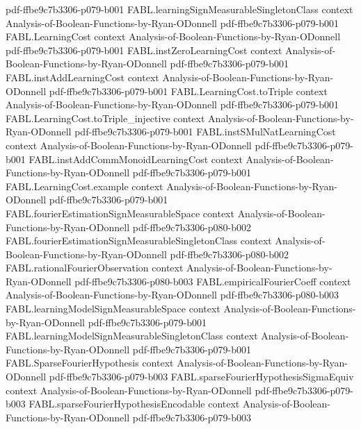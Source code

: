 \begin{theorem}
  {pdf-ffbe9c7b3306-p079-b001}
\proofstep
  {FABL.learningSignMeasurableSingletonClass}
  {context}
  {Analysis-of-Boolean-Functions-by-Ryan-ODonnell}
  {pdf-ffbe9c7b3306-p079-b001}
\proofstep
  {FABL.LearningCost}
  {context}
  {Analysis-of-Boolean-Functions-by-Ryan-ODonnell}
  {pdf-ffbe9c7b3306-p079-b001}
\proofstep
  {FABL.instZeroLearningCost}
  {context}
  {Analysis-of-Boolean-Functions-by-Ryan-ODonnell}
  {pdf-ffbe9c7b3306-p079-b001}
\proofstep
  {FABL.instAddLearningCost}
  {context}
  {Analysis-of-Boolean-Functions-by-Ryan-ODonnell}
  {pdf-ffbe9c7b3306-p079-b001}
\proofstep
  {FABL.LearningCost.toTriple}
  {context}
  {Analysis-of-Boolean-Functions-by-Ryan-ODonnell}
  {pdf-ffbe9c7b3306-p079-b001}
\proofstep
  {FABL.LearningCost.toTriple_injective}
  {context}
  {Analysis-of-Boolean-Functions-by-Ryan-ODonnell}
  {pdf-ffbe9c7b3306-p079-b001}
\proofstep
  {FABL.instSMulNatLearningCost}
  {context}
  {Analysis-of-Boolean-Functions-by-Ryan-ODonnell}
  {pdf-ffbe9c7b3306-p079-b001}
\proofstep
  {FABL.instAddCommMonoidLearningCost}
  {context}
  {Analysis-of-Boolean-Functions-by-Ryan-ODonnell}
  {pdf-ffbe9c7b3306-p079-b001}
\proofstep
  {FABL.LearningCost.example}
  {context}
  {Analysis-of-Boolean-Functions-by-Ryan-ODonnell}
  {pdf-ffbe9c7b3306-p079-b001}
\proofstep
  {FABL.fourierEstimationSignMeasurableSpace}
  {context}
  {Analysis-of-Boolean-Functions-by-Ryan-ODonnell}
  {pdf-ffbe9c7b3306-p080-b002}
\proofstep
  {FABL.fourierEstimationSignMeasurableSingletonClass}
  {context}
  {Analysis-of-Boolean-Functions-by-Ryan-ODonnell}
  {pdf-ffbe9c7b3306-p080-b002}
\proofstep
  {FABL.rationalFourierObservation}
  {context}
  {Analysis-of-Boolean-Functions-by-Ryan-ODonnell}
  {pdf-ffbe9c7b3306-p080-b003}
\proofstep
  {FABL.empiricalFourierCoeff}
  {context}
  {Analysis-of-Boolean-Functions-by-Ryan-ODonnell}
  {pdf-ffbe9c7b3306-p080-b003}
\proofstep
  {FABL.learningModelSignMeasurableSpace}
  {context}
  {Analysis-of-Boolean-Functions-by-Ryan-ODonnell}
  {pdf-ffbe9c7b3306-p079-b001}
\proofstep
  {FABL.learningModelSignMeasurableSingletonClass}
  {context}
  {Analysis-of-Boolean-Functions-by-Ryan-ODonnell}
  {pdf-ffbe9c7b3306-p079-b001}
\proofstep
  {FABL.SparseFourierHypothesis}
  {context}
  {Analysis-of-Boolean-Functions-by-Ryan-ODonnell}
  {pdf-ffbe9c7b3306-p079-b003}
\proofstep
  {FABL.sparseFourierHypothesisSigmaEquiv}
  {context}
  {Analysis-of-Boolean-Functions-by-Ryan-ODonnell}
  {pdf-ffbe9c7b3306-p079-b003}
\proofstep
  {FABL.sparseFourierHypothesisEncodable}
  {context}
  {Analysis-of-Boolean-Functions-by-Ryan-ODonnell}
  {pdf-ffbe9c7b3306-p079-b003}

\end{theorem}
